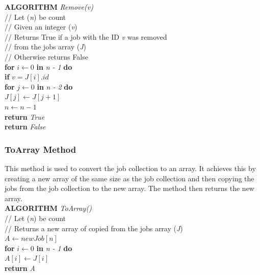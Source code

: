 \documentclass[12pt,a4paper]{article}
\begin{document}
				\textbf{ALGORITHM} \textit{Remove(v)}\\
				\null\qquad\quad// Let (\textit{n}) be count\\
				\null\qquad\quad// Given an integer (\textit{v})\\
				\null\qquad\quad// Returns True if a job with the ID \textit{v} was removed\\
				\null\qquad\quad// from the jobs array (\textit{J})\\
				\null\qquad\quad// Otherwise returns False\\
				\null\qquad\quad\textbf{for} \textit{$i \gets 0$} \textbf{in} \textit{n - 1} \textbf{do}\\
				\null\qquad\qquad\textbf{if} \textit{$v = J[i].id$}\\
				\null\qquad\qquad\qquad\textbf{for} \textit{$j \gets 0$} \textbf{in} \textit{n - 2} \textbf{do}\\
				\null\qquad\qquad\qquad\quad\textit{$J[j] \gets J[j + 1]$}\\
				\null\qquad\qquad\qquad\textit{$n \gets n - 1$}\\
				\null\qquad\qquad\qquad\textbf{return} \textit{True}\\
				\null\qquad\quad\textbf{return} \textit{False}\\
			
			\newpage
			
			\subsubsection{ToArray Method}
				This method is used to convert the job collection to an array. It achieves this by creating a 
				new array of the same size as the job collection and then copying the jobs from the job 
				collection to the new array. The method then returns the new array.\\

				\textbf{ALGORITHM} \textit{ToArray()}\\
				\null\qquad\quad// Let (\textit{n}) be count\\
				\null\qquad\quad// Returns a new array of copied from the jobs array (\textit{J})\\
				\null\qquad\quad\textit{$A \gets new Job[n]$}\\
				\null\qquad\quad\textbf{for} \textit{$i \gets 0$} \textbf{in} \textit{n - 1} \textbf{do}\\
				\null\qquad\qquad\textit{$A[i] \gets J[i]$}\\
				\null\qquad\quad\textbf{return} \textit{A}\\
				
\end{document}
